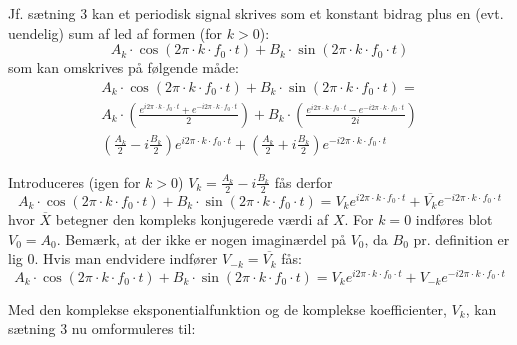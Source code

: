 \documentclass[11pt,a4paper]{article}
\begin{document}
\noindent{}Jf. sætning 3 kan et periodisk signal skrives som et konstant bidrag plus en (evt. uendelig) sum af led af formen (for $k>0$):
\begin{equation}
A_k\cdot\cos(2\pi\cdot{}k\cdot{}f_0\cdot{}t)+B_k\cdot\sin(2\pi\cdot{}k\cdot{}f_0\cdot{}t)
\end{equation}
\noindent{}som kan omskrives på følgende måde:
\begin{multline}
A_k\cdot\cos(2\pi\cdot{}k\cdot{}f_0\cdot{}t)+B_k\cdot\sin(2\pi\cdot{}k\cdot{}f_0\cdot{}t) = \\
A_k\cdot\left(\frac{e^{i2\pi\cdot{}k\cdot{}f_0\cdot{}t}+e^{-i2\pi\cdot{}k\cdot{}f_0\cdot{}t}}{2}\right)+B_k\cdot\left(\frac{e^{i2\pi\cdot{}k\cdot{}f_0\cdot{}t}-e^{-i2\pi\cdot{}k\cdot{}f_0\cdot{}t}}{2i}\right)\\		
\left(\frac{A_k}{2}-i\frac{B_k}{2}\right)e^{i2\pi\cdot{}k\cdot{}f_0\cdot{}t}+\left(\frac{A_k}{2}+i\frac{B_k}{2}\right)e^{-i2\pi\cdot{}k\cdot{}f_0\cdot{}t}
\end{multline}

\noindent{}Introduceres (igen for $k>0$) $V_k=\frac{A_k}{2}-i\frac{B_k}{2}$ fås derfor
\begin{equation}
A_k\cdot\cos(2\pi\cdot{}k\cdot{}f_0\cdot{}t)+B_k\cdot\sin(2\pi\cdot{}k\cdot{}f_0\cdot{}t) = V_{k}e^{i2\pi\cdot{}k\cdot{}f_0\cdot{}t}+\overline{V_{k}}e^{-i2\pi\cdot{}k\cdot{}f_0\cdot{}t}
\end{equation}
\noindent{}hvor $\overline{X}$ betegner den kompleks konjugerede værdi af $X$. For $k=0$ indføres blot $V_0=A_0$. Bemærk, at der ikke er nogen imaginærdel på $V_0$, da $B_0$ pr. definition er lig 0. Hvis man endvidere indfører $V_{-k}=\overline{V_{k}}$ fås:
\begin{equation}
A_k\cdot\cos(2\pi\cdot{}k\cdot{}f_0\cdot{}t)+B_k\cdot\sin(2\pi\cdot{}k\cdot{}f_0\cdot{}t) = V_{k}e^{i2\pi\cdot{}k\cdot{}f_0\cdot{}t}+V_{-k}e^{-i2\pi\cdot{}k\cdot{}f_0\cdot{}t}
\end{equation}

\noindent{}Med den komplekse eksponentialfunktion og de komplekse koefficienter, $V_k$, kan sætning 3 nu omformuleres til:

\vspace{\baselineskip}\vspace{\baselineskip}
\end{document}

